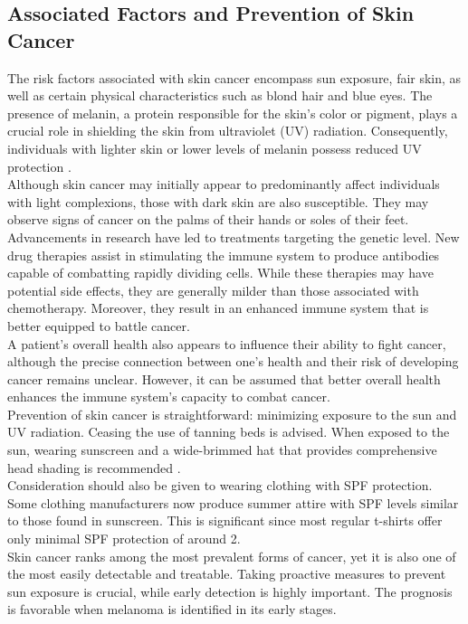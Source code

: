 \newpage

\subsection{Associated Factors and Prevention of Skin Cancer}

The risk factors associated with skin cancer encompass sun exposure, fair skin, as well as certain physical characteristics such as blond hair and blue eyes. The presence of melanin, a protein responsible for the skin's color or pigment, plays a crucial role in shielding the skin from ultraviolet (UV) radiation. Consequently, individuals with lighter skin or lower levels of melanin possess reduced UV protection \cite{OrigenAndTreatment}. \\

Although skin cancer may initially appear to predominantly affect individuals with light complexions, those with dark skin are also susceptible. They may observe signs of cancer on the palms of their hands or soles of their feet. \\

Advancements in research have led to treatments targeting the genetic level. New drug therapies assist in stimulating the immune system to produce antibodies capable of combatting rapidly dividing cells. While these therapies may have potential side effects, they are generally milder than those associated with chemotherapy. Moreover, they result in an enhanced immune system that is better equipped to battle cancer. \\

A patient's overall health also appears to influence their ability to fight cancer, although the precise connection between one's health and their risk of developing cancer remains unclear. However, it can be assumed that better overall health enhances the immune system's capacity to combat cancer. \\

Prevention of skin cancer is straightforward: minimizing exposure to the sun and UV radiation. Ceasing the use of tanning beds is advised. When exposed to the sun, wearing sunscreen and a wide-brimmed hat that provides comprehensive head shading is recommended \cite{OrigenAndTreatment}. \\

Consideration should also be given to wearing clothing with SPF protection. Some clothing manufacturers now produce summer attire with SPF levels similar to those found in sunscreen. This is significant since most regular t-shirts offer only minimal SPF protection of around 2. \\

Skin cancer ranks among the most prevalent forms of cancer, yet it is also one of the most easily detectable and treatable. Taking proactive measures to prevent sun exposure is crucial, while early detection is highly important. The prognosis is favorable when melanoma is identified in its early stages.

